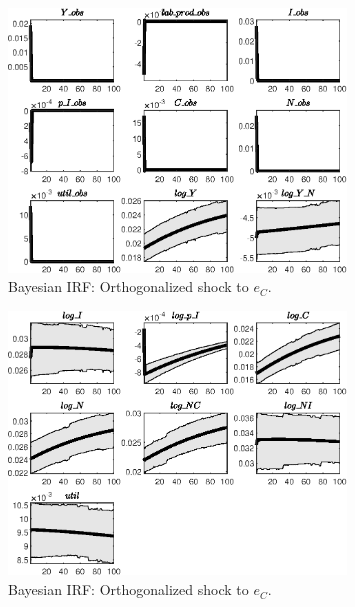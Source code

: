 \begin{figure}[H]
\centering 
\includegraphics[width=0.80\textwidth]{BRS_imp_mobility_alt/Output/BRS_imp_mobility_alt_Bayesian_IRF_e_C_1}
\caption{Bayesian IRF: Orthogonalized shock to ${e_C}$.}
\label{Fig:BayesianIRF:e_C:1}
\end{figure}
 
\begin{figure}[H]
\centering 
\includegraphics[width=0.80\textwidth]{BRS_imp_mobility_alt/Output/BRS_imp_mobility_alt_Bayesian_IRF_e_C_2}
\caption{Bayesian IRF: Orthogonalized shock to ${e_C}$.}
\label{Fig:BayesianIRF:e_C:2}
\end{figure}
 
